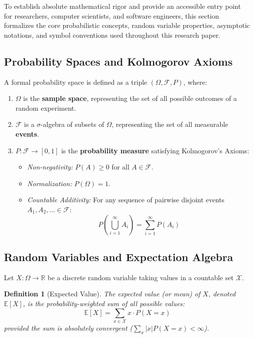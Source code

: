 \documentclass[10pt,journal,compsoc,onecolumn]{IEEEtran}
\newtheorem{definition}[theorem]{Definition}
\begin{document}
To establish absolute mathematical rigor and provide an accessible entry point for researchers, computer scientists, and software engineers, this section formalizes the core probabilistic concepts, random variable properties, asymptotic notations, and symbol conventions used throughout this research paper.

\subsection{Probability Spaces and Kolmogorov Axioms}

A formal probability space is defined as a triple $(\Omega, \mathcal{F}, P)$, where:
\begin{enumerate}
    \item $\Omega$ is the \textbf{sample space}, representing the set of all possible outcomes of a random experiment.
    \item $\mathcal{F}$ is a $\sigma$-algebra of subsets of $\Omega$, representing the set of all measurable \textbf{events}.
    \item $P: \mathcal{F} \rightarrow [0, 1]$ is the \textbf{probability measure} satisfying Kolmogorov's Axioms:
    \begin{itemize}
        \item \emph{Non-negativity:} $P(A) \ge 0$ for all $A \in \mathcal{F}$.
        \item \emph{Normalization:} $P(\Omega) = 1$.
        \item \emph{Countable Additivity:} For any sequence of pairwise disjoint events $A_1, A_2, \dots \in \mathcal{F}$:
        \[
        P\left( \bigcup_{i=1}^{\infty} A_i \right) = \sum_{i=1}^{\infty} P(A_i)
        \]
    \end{itemize}
\end{enumerate}

\subsection{Random Variables and Expectation Algebra}

Let $X: \Omega \rightarrow \mathbb{R}$ be a discrete random variable taking values in a countable set $\mathcal{X}$.

\begin{definition}[Expected Value]
The expected value (or mean) of $X$, denoted $\mathbb{E}[X]$, is the probability-weighted sum of all possible values:
\begin{equation}
\mathbb{E}[X] = \sum_{x \in \mathcal{X}} x \cdot P(X = x)
\label{eq:expected-value-def}
\end{equation}
provided the sum is absolutely convergent ($\sum_x |x| P(X=x) < \infty$).
\end{definition}
\end{document}
